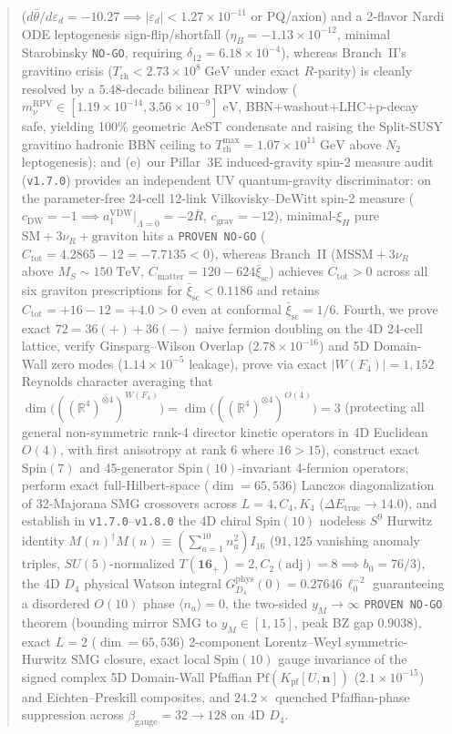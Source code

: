 \documentclass[11pt,a4paper]{article}
\begin{document}
\begin{abstract}
($d\bar\theta/d\varepsilon_d=-10.27 \implies |\varepsilon_d|<1.27\times 10^{-11}$ or PQ/axion) and a 2-flavor Nardi ODE leptogenesis sign-flip/shortfall ($\eta_B=-1.13\times 10^{-12}$, minimal Starobinsky \texttt{NO-GO}, requiring $\delta_{12}=6.18\times 10^{-4}$), whereas Branch~II's gravitino crisis ($T_{\mathrm{rh}} < 2.73\times 10^8\;\mathrm{GeV}$ under exact $R$-parity) is cleanly resolved by a $5.48$-decade bilinear RPV window ($m_\nu^{\mathrm{RPV}} \in [1.19\times 10^{-14}, 3.56\times 10^{-9}]\;\mathrm{eV}$, BBN+washout+LHC+p-decay safe, yielding 100\% geometric AeST condensate and raising the Split-SUSY gravitino hadronic BBN ceiling to $T_{\mathrm{rh}}^{\max} = 1.07\times 10^{11}\;\mathrm{GeV}$ above $N_2$ leptogenesis); and (e)~our Pillar~3E induced-gravity spin-2 measure audit (\texttt{v1.7.0}) provides an independent UV quantum-gravity discriminator: on the parameter-free 24-cell 12-link Vilkovisky--DeWitt spin-2 measure ($c_{\mathrm{DW}}=-1 \implies a_1^{\mathrm{VDW}}|_{\Lambda=0}=-2\bar R$, $c_{\mathrm{grav}}=-12$), minimal-$\xi_H$ pure $\mathrm{SM}+3\nu_R+\text{graviton}$ hits a \texttt{PROVEN NO-GO} ($C_{\mathrm{tot}}=4.2865-12=-7.7135<0$), whereas Branch~II ($\mathrm{MSSM}+3\nu_R$ above $M_S\sim 150\;\mathrm{TeV}$, $C_{\mathrm{matter}}=120-624\bar\xi_{\mathrm{sc}}$) achieves $C_{\mathrm{tot}}>0$ across all six graviton prescriptions for $\bar\xi_{\mathrm{sc}}<0.1186$ and retains $C_{\mathrm{tot}}=+16-12=+4.0>0$ even at conformal $\bar\xi_{\mathrm{sc}}=1/6$.
Fourth, we prove exact $72 = 36(+) + 36(-)$ naive fermion doubling on the 4D 24-cell lattice, verify Ginsparg--Wilson Overlap ($2.78\times 10^{-16}$) and 5D Domain-Wall zero modes ($1.14\times 10^{-5}$ leakage), prove via exact $|W(F_4)| = 1{,}152$ Reynolds character averaging that $\dim\bigl(((\mathbb{R}^4)^{\otimes 4})^{W(F_4)}\bigr) = \dim\bigl(((\mathbb{R}^4)^{\otimes 4})^{O(4)}\bigr) = 3$ (protecting all general non-symmetric rank-4 director kinetic operators in 4D Euclidean $O(4)$, with first anisotropy at rank 6 where $16 > 15$), construct exact $\mathrm{Spin}(7)$ and 45-generator $\mathrm{Spin}(10)$-invariant 4-fermion operators, perform exact full-Hilbert-space ($\dim = 65{,}536$) Lanczos diagonalization of 32-Majorana SMG crossovers across $L=4, C_4, K_4$ ($\Delta E_{\mathrm{true}} \to 14.0$), and establish in \texttt{v1.7.0}--\texttt{v1.8.0} the 4D chiral $\mathrm{Spin}(10)$ nodeless $S^9$ Hurwitz identity $M(n)^\dagger M(n)\equiv (\sum_{a=1}^{10} n_a^2)I_{16}$ ($91{,}125$ vanishing anomaly triples, $SU(5)$-normalized $T(\mathbf{16}_+)=2, C_2(\mathrm{adj})=8 \implies b_0=76/3$), the 4D $D_4$ physical Watson integral $G_{D_4}^{\mathrm{phys}}(0)=0.27646\,\ell_0^{-2}$ guaranteeing a disordered $O(10)$ phase $\langle n_a\rangle=0$, the two-sided $y_M\to\infty$ \texttt{PROVEN NO-GO} theorem (bounding mirror SMG to $y_M\in[1,15]$, peak BZ gap $0.9038$), exact $L=2$ ($\dim=65{,}536$) 2-component Lorentz--Weyl symmetric-Hurwitz SMG closure, exact local $\mathrm{Spin}(10)$ gauge invariance of the signed complex 5D Domain-Wall Pfaffian $\mathrm{Pf}(K_{\mathrm{pf}}[U,\mathbf{n}])$ ($2.1\times 10^{-15}$) and Eichten--Preskill composites, and $24.2\times$ quenched Pfaffian-phase suppression across $\beta_{\mathrm{gauge}}=32\to 128$ on 4D $D_4$.
\end{abstract}
\end{document}
